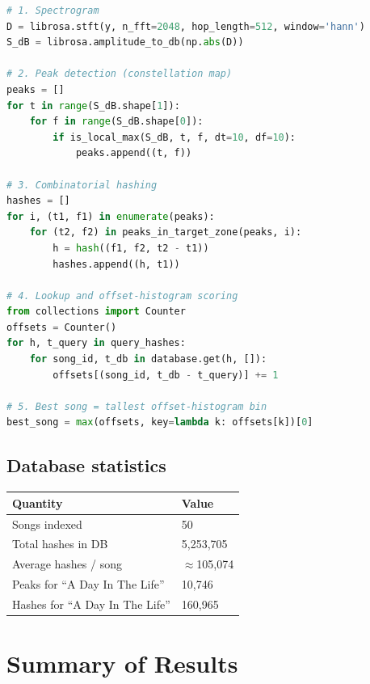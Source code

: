 \documentclass[11pt,a4paper]{article}
\begin{document}
\begin{lstlisting}[language=Python, caption={Core fingerprinting and matching pipeline (simplified).}]
# 1. Spectrogram
D = librosa.stft(y, n_fft=2048, hop_length=512, window='hann')
S_dB = librosa.amplitude_to_db(np.abs(D))

# 2. Peak detection (constellation map)
peaks = []
for t in range(S_dB.shape[1]):
    for f in range(S_dB.shape[0]):
        if is_local_max(S_dB, t, f, dt=10, df=10):
            peaks.append((t, f))

# 3. Combinatorial hashing
hashes = []
for i, (t1, f1) in enumerate(peaks):
    for (t2, f2) in peaks_in_target_zone(peaks, i):
        h = hash((f1, f2, t2 - t1))
        hashes.append((h, t1))

# 4. Lookup and offset-histogram scoring
from collections import Counter
offsets = Counter()
for h, t_query in query_hashes:
    for song_id, t_db in database.get(h, []):
        offsets[(song_id, t_db - t_query)] += 1

# 5. Best song = tallest offset-histogram bin
best_song = max(offsets, key=lambda k: offsets[k])[0]
\end{lstlisting}

\subsection{Database statistics}

\begin{center}\small
\begin{tabular}{ll}
\toprule
\textbf{Quantity} & \textbf{Value} \\
\midrule
Songs indexed & 50 \\
Total hashes in DB & 5{,}253{,}705 \\
Average hashes / song & $\approx$105{,}074 \\
Peaks for ``A Day In The Life'' & 10{,}746 \\
Hashes for ``A Day In The Life'' & 160{,}965 \\
\bottomrule
\end{tabular}
\end{center}

\section{Summary of Results}
\end{document}
